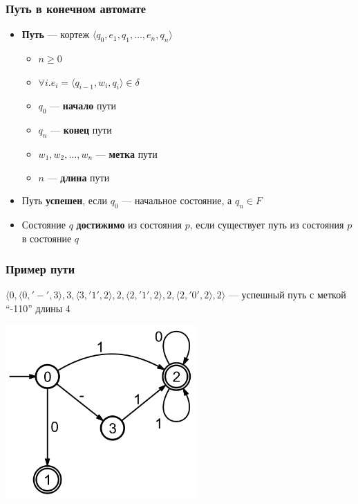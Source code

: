\documentclass{beamer}
\begin{document}
\begin{frame}[fragile]
  \transwipe[direction=90]
  \frametitle{Путь в конечном автомате}
  \begin{itemize}
    \item \textbf{Путь} --- кортеж $\langle q_0, e_1, q_1, \dots, e_n, q_n\rangle$
    \begin{itemize}
      \item $n \geq 0$
      \item $\forall i. e_i = \langle q_{i-1}, w_i, q_i\rangle \in \delta$
      \item $q_0$ --- \textbf{начало} пути
      \item $q_n$ --- \textbf{конец} пути
      \item $w_1, w_2, \dots, w_n$ --- \textbf{метка} пути
      \item $n$ --- \textbf{длина} пути
    \end{itemize}
    \item Путь \textbf{успешен}, если $q_0$ --- начальное состояние, а $q_n \in F$
    \item Состояние $q$ \textbf{достижимо} из состояния $p$, если существует путь из состояния $p$ в состояние $q$
  \end{itemize}
\end{frame}

\begin{frame}[fragile]
  \transwipe[direction=90]
  \frametitle{Пример пути}

  $\langle 0, \langle 0, '-', 3 \rangle, 3, \langle 3, '1', 2 \rangle, 2, \langle 2, '1', 2 \rangle, 2, \langle 2, '0', 2 \rangle, 2\rangle$ --- успешный путь с меткой ``-110'' длины 4

  \begin{center}
     \includegraphics[width=0.55\textwidth]{pics/automaton.png}  
   \end{center}
\end{frame}
\end{document}
